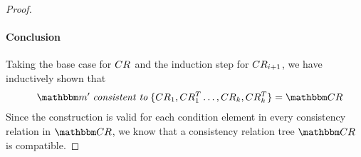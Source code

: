 \begin{proof}
    \paragraph{Conclusion}
    Taking the base case for $CR_{}$ and the induction step for $CR_{i+1}$, we have inductively shown that 
    \begin{align*}
        \formulaskip 
        \modelset{m'} \consistenttomath \setted{\consistencyrelation{CR}{1}, \consistencyrelation{CR^T}{1} \dots, \consistencyrelation{CR}{k}, \consistencyrelation{CR^T}{k}} = \consistencyrelationset{CR}
    \end{align*}
    Since the construction is valid for each condition element in every consistency relation in $\consistencyrelationset{CR}$, we know that a consistency relation tree $\consistencyrelationset{CR}$ is compatible.
    

\end{proof}

